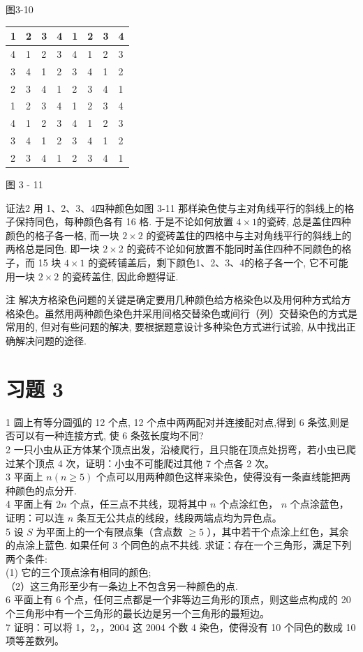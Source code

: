 \documentclass[10pt]{article}
\begin{document}
图3-10

\begin{center}
\begin{tabular}{|l|l|l|l|l|l|l|l|}
\hline
1 & 2 & 3 & 4 & 1 & 2 & 3 & 4 \\
\hline
4 & 1 & 2 & 3 & 4 & 1 & 2 & 3 \\
\hline
3 & 4 & 1 & 2 & 3 & 4 & 1 & 2 \\
\hline
2 & 3 & 4 & 1 & 2 & 3 & 4 & 1 \\
\hline
1 & 2 & 3 & 4 & 1 & 2 & 3 & 4 \\
\hline
4 & 1 & 2 & 3 & 4 & 1 & 2 & 3 \\
\hline
3 & 4 & 1 & 2 & 3 & 4 & 1 & 2 \\
\hline
2 & 3 & 4 & 1 & 2 & 3 & 4 & 1 \\
\hline
\end{tabular}
\end{center}

图 3 - 11

证法2 用 1、2、3、4四种颜色如图 3-11 那样染色使与主对角线平行的斜线上的格子保持同色，每种颜色各有 16 格. 于是不论如何放置 $4 \times 1$的瓷砖, 总是盖住四种颜色的格子各一格, 而一块 $2 \times 2$ 的瓷砖盖住的四格中与主对角线平行的斜线上的两格总是同色. 即一块 $2 \times 2$ 的瓷砖不论如何放置不能同时盖住四种不同颜色的格子，而 15 块 $4 \times 1$ 的瓷砖铺盖后，剩下颜色1、2、3、4的格子各一个, 它不可能用一块 $2 \times 2$ 的瓷砖盖住, 因此命题得证.

注 解决方格染色问题的关键是确定要用几种颜色给方格染色以及用何种方式给方格染色。虽然用两种颜色染色并采用间格交替染色或间行（列）交替染色的方式是常用的, 但对有些问题的解决, 要根据题意设计多种染色方式进行试验, 从中找出正确解决问题的途径.

\section{习题 3}
1 圆上有等分圆弧的 12 个点, 12 个点中两两配对并连接配对点,得到 6 条弦,则是否可以有一种连接方式, 使 6 条弦长度均不同?\\
2 一只小虫从正方体某个顶点出发，沿棱爬行，且只能在顶点处拐弯，若小虫已爬过某个顶点 4 次，证明：小虫不可能爬过其他 7 个点各 2 次。\\
3 平面上 $n(n \geqslant 5)$ 个点可以用两种颜色这样来染色，使得没有一条直线能把两种颜色的点分开.\\
4 平面上有 $2 n$ 个点，任三点不共线，现将其中 $n$ 个点涂红色， $n$ 个点涂蓝色，证明：可以连 $n$ 条互无公共点的线段，线段两端点均为异色点。\\
5 设 $S$ 为平面上的一个有限点集（含点数 $\geqslant 5$ ），其中若干个点涂上红色，其余的点涂上蓝色. 如果任何 3 个同色的点不共线. 求证：存在一个三角形，满足下列两个条件:\\
(1) 它的三个顶点涂有相同的颜色;\\
（2）这三角形至少有一条边上不包含另一种颜色的点.\\
6 平面上有 6 个点，任何三点都是一个非等边三角形的顶点，则这些点构成的 20 个三角形中有一个三角形的最长边是另一个三角形的最短边。\\
7 证明：可以将 1，2，，2004 这 2004 个数 4 染色，使得没有 10 个同色的数成 10 项等差数列。
\end{document}
